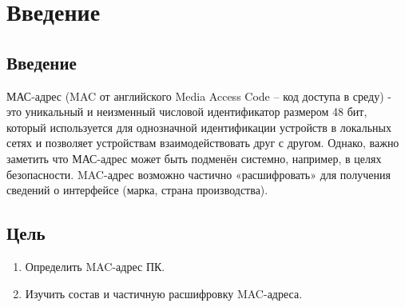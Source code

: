 \chapter{Введение}
\label{ch:intro}

\section{Введение}

МАС-адрес (MAC от английского Media Access Code – код доступа в среду) - это уникальный и неизменный числовой идентификатор размером 48 бит, который используется для однозначной идентификации устройств в локальных сетях и позволяет устройствам взаимодействовать друг с другом. Однако, важно заметить что МАС-адрес может быть подменён системно, например, в целях безопасности. MAC-адрес возможно частично
«расшифровать» для получения сведений о интерфейсе (марка, страна производства).


\section{Цель}  

\begin{enumerate}
    \item Определить MAC-адрес ПК.
    \item Изучить состав и частичную расшифровку MAC-адреса.
\end{enumerate}

\endinput